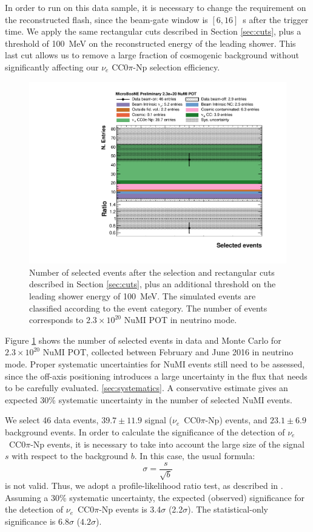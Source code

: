 In order to run on this data sample, it is necessary to change the requirement on the reconstructed flash, since the beam-gate window is $[6,16]$~\si{\micro}s after the trigger time.
We apply the same rectangular cuts described in Section \ref{sec:cuts}, plus a threshold of 100~MeV on the reconstructed energy of the leading shower. This last cut allows us to remove a large fraction of cosmogenic background without significantly affecting our $\nu_e$ CC0$\pi$-Np selection efficiency.

\begin{figure}[htbp]
\centering
  \includegraphics[width=0.75\linewidth]{figures/numi_events.pdf}
  \caption{Number of selected events after the selection and rectangular cuts described in Section \ref{sec:cuts}, plus an additional threshold on the leading shower energy of 100~MeV. The simulated events are classified according to the event category. The number of events corresponds to $2.3\times10^{20}$ NuMI POT in neutrino mode.}\label{fig:numi_nue}
\end{figure}

Figure \ref{fig:numi_nue} shows the number of selected events in data and Monte Carlo for $2.3\times10^{20}$ NuMI POT, collected between February and June 2016 in neutrino mode. Proper systematic uncertainties for NuMI events still need to be assessed, since the off-axis positioning introduces a large uncertainty in the flux that needs to be carefully evaluated.  \ref{sec:systematics}. A conservative estimate gives an expected 30\% systematic uncertainty in the number of selected NuMI events.

We select 46 data events, $39.7\pm11.9$ signal ($\nu_e$~CC0$\pi$-Np) events, and $23.1\pm6.9$ background events. In order to calculate the significance of the detection of $\nu_e$~CC0$\pi$-Np events, it is necessary to take into account the large size of the signal $s$ with respect to the background $b$. In this case, the usual formula:
\begin{equation}
    \sigma = \frac{s}{\sqrt{b}}
\end{equation}
is not valid. Thus, we adopt a profile-likelihood ratio test, as described in \cite{Cowan:2010js}.
Assuming a 30\% systematic uncertainty, the expected (observed) significance for the detection of $\nu_e$~CC0$\pi$-Np events is 3.4$\sigma$ (2.2$\sigma$). The statistical-only significance is $6.8\sigma$ ($4.2\sigma$).

